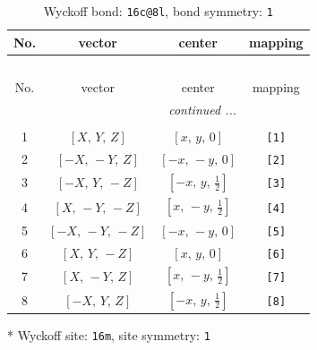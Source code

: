 \documentclass[fleqn,8pt]{jsarticle}
\begin{document}
\renewcommand{\arraystretch}{1.2}
\begin{longtable}{cccc}
\caption{Wyckoff bond: {\tt 16c@8l}, bond symmetry: {\tt 1}}
 \\
 \hline \hline
No. & vector & center & mapping \\ \hline \endfirsthead

\multicolumn{3}{l}{\tablename\ \thetable{}} \\
 \hline \hline
No. & vector & center & mapping \\ \hline \endhead

 \hline \hline
\multicolumn{3}{r}{\footnotesize\it continued ...} \\ \endfoot

 \hline \hline
\multicolumn{3}{r}{} \\ \endlastfoot

1 & $\left[ X,\, Y,\, Z \right]$ & $\left[ x,\, y,\, 0 \right]$ & {\tt [1]} \\ \hline
2 & $\left[ - X,\, - Y,\, Z \right]$ & $\left[ - x,\, - y,\, 0 \right]$ & {\tt [2]} \\ \hline
3 & $\left[ - X,\, Y,\, - Z \right]$ & $\left[ - x,\, y,\, \frac{1}{2} \right]$ & {\tt [3]} \\ \hline
4 & $\left[ X,\, - Y,\, - Z \right]$ & $\left[ x,\, - y,\, \frac{1}{2} \right]$ & {\tt [4]} \\ \hline
5 & $\left[ - X,\, - Y,\, - Z \right]$ & $\left[ - x,\, - y,\, 0 \right]$ & {\tt [5]} \\ \hline
6 & $\left[ X,\, Y,\, - Z \right]$ & $\left[ x,\, y,\, 0 \right]$ & {\tt [6]} \\ \hline
7 & $\left[ X,\, - Y,\, Z \right]$ & $\left[ x,\, - y,\, \frac{1}{2} \right]$ & {\tt [7]} \\ \hline
8 & $\left[ - X,\, Y,\, Z \right]$ & $\left[ - x,\, y,\, \frac{1}{2} \right]$ & {\tt [8]} \\
\end{longtable}
* Wyckoff site: {\tt 16m}, site symmetry: {\tt 1}
\renewcommand{\arraystretch}{1.2}
\end{document}
